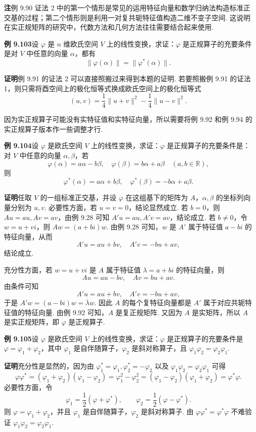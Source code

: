 \documentclass[UTF8, 12pt, fontset=fandol, oneside]{ctexart}
\begin{document}
\noindent\textbf{注}\quad 例 9.90 证法 2 中的第一个情形是常见的运用特征向量和数学归纳法构造标准正交基的过程；第二个情形则是利用一对复共轭特征值构造二维不变子空间. 这说明在实正规矩阵的研究中，代数方法和几何方法往往需要结合起来使用.

\noindent\textbf{例 9.103}\quad 设 $\varphi$ 是 $n$ 维欧氏空间 $V$ 上的线性变换，求证：$\varphi$ 是正规算子的充要条件是对 $V$ 中任意的向量 $\alpha$，都有
\[
\|\varphi(\alpha)\|=\|\varphi^*(\alpha)\|.
\]

\noindent\textbf{证明}\quad 例 9.91 的证法 2 可以直接照搬过来得到本题的证明. 若要照搬例 9.91 的证法 1，则只需将酉空间上的极化恒等式换成欧氏空间上的极化恒等式
\[
(u,v)=\frac{1}{4}\|u+v\|^2-\frac{1}{4}\|u-v\|^2.
\]

因为实正规算子可能没有实特征值和实特征向量，所以需要将例 9.92 和例 9.94 的实正规算子版本作一些调整才行.

\noindent\textbf{例 9.104}\quad 设 $\varphi$ 是欧氏空间 $V$ 上的线性变换，求证：$\varphi$ 是正规算子的充要条件是：对 $V$ 中任意的向量 $\alpha,\beta$，若
\[
\varphi(\alpha)=a\alpha-b\beta,\quad \varphi(\beta)=b\alpha+a\beta\quad (a,b\in\mathbb{R}),
\]
则
\[
\varphi^*(\alpha)=a\alpha+b\beta,\quad \varphi^*(\beta)=-b\alpha+a\beta.
\]

\noindent\textbf{证明}\quad 任取 $V$ 的一组标准正交基，并设 $\varphi$ 在这组基下的矩阵为 $A$，$\alpha,\beta$ 的坐标列向量分别为 $u,v$. 必要性方面，若 $u=v=0$，结论显然成立. 若 $b=0$，则 $Au=au,Av=av$，由例 9.28 可知 $A'u=au,A'v=av$，结论成立. 若 $b\ne0$，令 $w=u+vi$，则 $Aw=(a+bi)w$. 由例 9.28 可知，$w$ 是 $A'$ 属于特征值 $a-bi$ 的特征向量，从而
\[
A'u=a u+b v,\quad A'v=-b u+a v,
\]
结论成立.

充分性方面，若 $w=u+vi$ 是 $A$ 属于特征值 $\lambda=a+bi$ 的特征向量，则
\[
Au=au-bv,\quad Av=bu+av.
\]
由条件可知
\[
A'u=au+bv,\quad A'v=-bu+av,
\]
于是 $A'w=(a-bi)w=\overline{\lambda}w$. 因此 $A$ 的每个复特征向量都是 $A'$ 属于对应共轭特征值的特征向量. 由例 9.92 可知，$A$ 是复正规矩阵. 又因为 $A$ 是实矩阵，所以 $A$ 是实正规矩阵，即 $\varphi$ 是正规算子.

\noindent\textbf{例 9.105}\quad 设 $\varphi$ 是欧氏空间 $V$ 上的线性变换，求证：$\varphi$ 是正规算子的充要条件是 $\varphi=\varphi_1+\varphi_2$，其中 $\varphi_1$ 是自伴随算子，$\varphi_2$ 是斜对称算子，且 $\varphi_1\varphi_2=\varphi_2\varphi_1$.

\noindent\textbf{证明}\quad 充分性是显然的，因为由 $\varphi_1^*=\varphi_1,\varphi_2^*=-\varphi_2$ 以及 $\varphi_1\varphi_2=\varphi_2\varphi_1$ 可得
\[
\varphi\varphi^*=(\varphi_1+\varphi_2)(\varphi_1-\varphi_2)=\varphi_1^2-\varphi_2^2=(\varphi_1-\varphi_2)(\varphi_1+\varphi_2)=\varphi^*\varphi.
\]
必要性方面，令
\[
\varphi_1=\frac{1}{2}(\varphi+\varphi^*),\qquad \varphi_2=\frac{1}{2}(\varphi-\varphi^*).
\]
则 $\varphi=\varphi_1+\varphi_2$，并且 $\varphi_1$ 是自伴随算子，$\varphi_2$ 是斜对称算子. 由 $\varphi\varphi^*=\varphi^*\varphi$ 不难验证 $\varphi_1\varphi_2=\varphi_2\varphi_1$.
\end{document}
